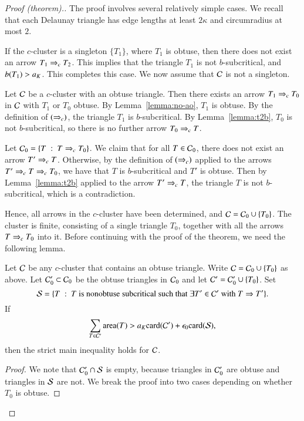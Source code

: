 \begin{proof}[Proof (theorem).] 
  The proof involves several relatively simple cases.  
  We recall that each Delaunay triangle has edge lengths at
  least $2\kappa$ and circumradius at most $2$.

  If the $c$-cluster is a singleton $\{T_1\}$, where $T_1$ is obtuse,
  then there does not exist an arrow 
$T_1\ra{c} T_2$.  This implies that the triangle $T_1$ is
  not $b$-subcritical, and $b(T_1) > \aK$.  This completes this case.
  We now assume that $\C$ is not a singleton.

  Let $\C$ be a $c$-cluster with an obtuse triangle.  Then there
  exists an arrow $T_1 \ra{c} T_0$ in $\C$ with $T_1$ or $T_0$ obtuse.
  By Lemma~\ref{lemma:no-ao}, $T_1$ is obtuse.  By the definition of
  $(\ra{c})$, the triangle $T_1$ is $b$-subcritical.  By
  Lemma~\ref{lemma:t2b}, $T_0$ is not $b$-subcritical, so there is no
  further arrow $T_0\ra{c} T$.

  Let $\C_0 = \{ T \mid T\ra{c} T_0\}$.  We claim that for all $T\in
  \C_0$, there does not exist an arrow $T' \ra{c} T$.  Otherwise, by
  the definition of $(\ra{c})$ applied to the arrows $T'\ra{c} T\ra{c}
  T_0$, we have that $T$ is $b$-subcritical and $T'$ is obtuse.  Then
  by Lemma~\ref{lemma:t2b} applied to the arrow $T'\ra{c} T$, the
  triangle $T$ is not $b$-subcritical, which is a contradiction.

  Hence, all arrows in the $c$-cluster have been determined, and $\C =
  \C_0 \cup \{T_0\}$.  The cluster is finite, consisting of a single
  triangle $T_0$, together with all the arrows $T\ra{c} T_0$ into it.
  Before continuing with the proof of the theorem, we need the
  following lemma.

\begin{lemma} Let $\C$ be any $c$-cluster that contains an obtuse
  triangle.  Write $\C = \C_0 \cup \{T_0\}$ as above.  Let
  $\C_0'\subset \C_0$ be the obtuse triangles in $\C_0$ and let $\C' =
  \C_0' \cup \{T_0\}$.  Set
\[
\S = \{T \mid T \text{ is nonobtuse subcritical such that } \exists
T'\in \C' \text{ with } T\rat T'\}.
\]
If
\begin{equation}\label{eqn:S}
\sum_{T\in \C'} \area(T) > a_K \card(\C') + \epso \card(\S),
\end{equation}
then the strict main inequality holds for $\C$.
\end{lemma}

\begin{proof}
  We note that $\C_0' \cap \S$ is empty, because triangles in $\C_0'$
  are obtuse and triangles in $\S$ are not.
  We break the proof into two cases depending on whether $T_0$ is
  obtuse.


\end{proof}
\end{proof}
